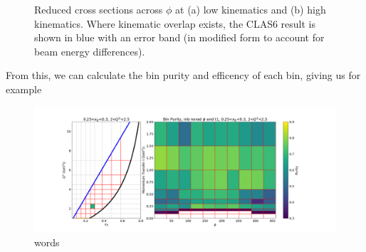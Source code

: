     
    \begin{figure}[H]
        \centering
        \hfill
        
        \caption[Reduced Cross Sections Across $\phi$]{Reduced cross sections across $\phi$ at (a) low kinematics and (b) high kinematics. Where kinematic overlap exists, the CLAS6 result \parencite{Bedlinskiy2014ExclusiveCLAS} is shown in blue with an error band (in modified form to account for beam energy differences). }\label{fig:mig_ex}
    \end{figure}
    
    
    From this, we can calculate the bin purity and efficency of each bin, giving us for example
    
    
    \begin{figure}[ht]
    \centering
    \includegraphics[trim={0 0 0 0},clip,width=\textwidth]{Chapters/Ch5-Further/0_IBU/pics/purities/inb_norad_t1/bin_purity_0.25_0.3_2_2.5.png}
    \caption[words]{words}
    \label{fig:ibu10}
    \end{figure}
    
